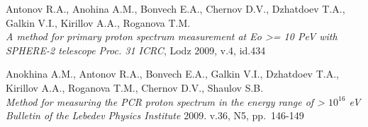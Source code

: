 \documentclass[a4paper,11pt]{article}
\begin{document}
\begin{thebibliography}{99}
Antonov R.A., Anohina A.M., Bonvech E.A., Chernov D.V., Dzhatdoev T.A., Galkin V.I., Kirillov A.A., Roganova T.M. \\
\textit{A method for primary proton spectrum measurement at Eo >= 10 PeV with SPHERE-2 telescope}
\textit{Proc. 31 ICRC}, Lodz 2009, v.4, id.434

Anokhina A.M., Antonov R.A., Bonvech E.A., Galkin V.I., Dzhatdoev T.A., Kirillov A.A., Roganova T.M., Chernov D.V., Shaulov S.B. \\
\textit{Method for measuring the PCR proton spectrum in the energy range of > $10^{16}$ eV} 
\textit{Bulletin of the Lebedev Physics Institute} 2009. v.36, N5, pp. 146-149  




\end{thebibliography}
\end{document}
